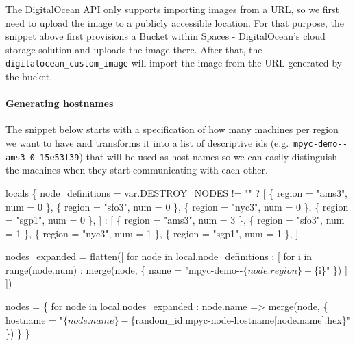 \documentclass[
]{article}
\newenvironment{Shaded}{}{}
\newcommand{\NormalTok}[1]{#1}
\begin{document}
The DigitalOcean API only supports importing images from a URL, so we
first need to upload the image to a publicly accessible location. For
that purpose, the snippet above first provisions a Bucket within Spaces
- DigitalOcean's cloud storage solution and uploads the image there.
After that, the \texttt{digitalocean\_custom\_image} will import the
image from the URL generated by the bucket.

\hypertarget{generating-hostnames}{%
  \paragraph{Generating hostnames}\label{generating-hostnames}}

The snippet below starts with a specification of how many machines per
region we want to have and transforms it into a list of descriptive ids
(e.g.~\texttt{mpyc-demo-\/-ams3-0-15e53f39}) that will be used as host
names so we can easily distinguish the machines when they start
communicating with each other.

\begin{Shaded}
  \begin{Highlighting}[]
    \NormalTok{locals \{}
    \NormalTok{  node\_definitions = var.DESTROY\_NODES != "" ? [}
    \NormalTok{    \{ region = "ams3", num = 0 \},}
    \NormalTok{    \{ region = "sfo3", num = 0 \},}
    \NormalTok{    \{ region = "nyc3", num = 0 \},}
    \NormalTok{    \{ region = "sgp1", num = 0 \},}
    \NormalTok{    ] : [}
    \NormalTok{    \{ region = "ams3", num = 3 \},}
    \NormalTok{    \{ region = "sfo3", num = 1 \},}
    \NormalTok{    \{ region = "nyc3", num = 1 \},}
    \NormalTok{    \{ region = "sgp1", num = 1 \},}
    \NormalTok{  ]}

    \NormalTok{  nodes\_expanded = flatten([}
    \NormalTok{    for node in local.node\_definitions : [}
    \NormalTok{      for i in range(node.num) :}
    \NormalTok{      merge(node, \{}
    \NormalTok{        name = "mpyc{-}demo{-}{-}$\{node.region\}{-}$\{i\}"}
    \NormalTok{      \})}
    \NormalTok{    ]}
    \NormalTok{  ])}

    \NormalTok{  nodes = \{}
    \NormalTok{    for node in local.nodes\_expanded :}
    \NormalTok{    node.name =\textgreater{} merge(node, \{}
    \NormalTok{      hostname = "$\{node.name\}{-}$\{random\_id.mpyc{-}node{-}hostname[node.name].hex\}"}
    \NormalTok{    \})}
    \NormalTok{  \}}
    \NormalTok{\}}
  \end{Highlighting}
\end{Shaded}
\end{document}
